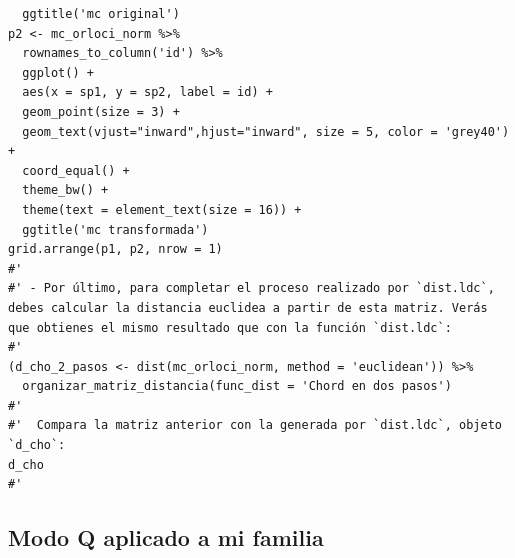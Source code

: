 \documentclass[11pt,]{article}
\begin{document}
\begin{verbatim}
  ggtitle('mc original')
p2 <- mc_orloci_norm %>%
  rownames_to_column('id') %>% 
  ggplot() +
  aes(x = sp1, y = sp2, label = id) +
  geom_point(size = 3) +
  geom_text(vjust="inward",hjust="inward", size = 5, color = 'grey40') +
  coord_equal() +
  theme_bw() +
  theme(text = element_text(size = 16)) +
  ggtitle('mc transformada')
grid.arrange(p1, p2, nrow = 1)
#'   
#' - Por último, para completar el proceso realizado por `dist.ldc`, debes calcular la distancia euclidea a partir de esta matriz. Verás que obtienes el mismo resultado que con la función `dist.ldc`:
#' 
(d_cho_2_pasos <- dist(mc_orloci_norm, method = 'euclidean')) %>% 
  organizar_matriz_distancia(func_dist = 'Chord en dos pasos')
#'
#'  Compara la matriz anterior con la generada por `dist.ldc`, objeto `d_cho`:
d_cho
#' 
\end{verbatim}

\subsection{Modo Q aplicado a mi
familia}\label{modo-q-aplicado-a-mi-familia}
\end{document}
